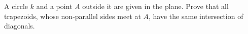 A circle $k$ and a point $A$ outside it are given in the plane. Prove that all trapezoids, whose non-parallel sides meet at $A$, have the same intersection of diagonals.
